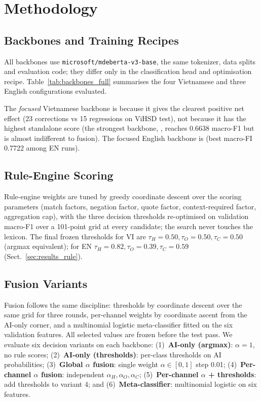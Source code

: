 \section{Methodology}
\label{sec:methodology}

\subsection{Backbones and Training Recipes}
\label{sec:backbones}

All backbones use \texttt{microsoft/mdeberta-v3-base}, the same tokenizer,
data splits and evaluation code; they differ only in the classification head
and optimisation recipe.  Table~\ref{tab:backbones_full} summarises the four
Vietnamese and three English configurations evaluated.



The \emph{focused} Vietnamese backbone is  because
it gives the clearest positive net effect (23 corrections vs 15 regressions on
ViHSD test), not because it has the highest standalone score (the strongest
backbone, , reaches 0.6638 macro-F1 but is
almost indifferent to fusion).  The focused English backbone is
 (best macro-FI 0.7722 among EN runs).

\subsection{Rule-Engine Scoring}
\label{sec:rule_scoring}

Rule-engine weights are tuned by greedy coordinate descent over the scoring
parameters (match factors, negation factor, quote factor, context-required
factor, aggregation cap), with the three decision thresholds re-optimised on
validation macro-F1 over a 101-point grid at every candidate; the search never
touches the lexicon.  The final frozen thresholds for VI are
$\tau_H=0.50, \tau_O=0.50, \tau_C=0.50$ (argmax equivalent); for EN
$\tau_H=0.82, \tau_O=0.39, \tau_C=0.59$ (Sect.~\ref{sec:results_rule}).

\subsection{Fusion Variants}
\label{sec:fusion_variants}

Fusion follows the same discipline: thresholds by coordinate descent over the
same grid for three rounds, per-channel weights by coordinate ascent from the
AI-only corner, and a multinomial logistic meta-classifier fitted on the six
validation features.  All selected values are frozen before the test pass.  We
evaluate six decision variants on each backbone:
(1)~\textbf{AI-only (argmax)}: $\alpha=1$, no rule scores;
(2)~\textbf{AI-only (thresholds)}: per-class thresholds on AI probabilities;
(3)~\textbf{Global $\alpha$ fusion}: single weight $\alpha \in [0,1]$ step 0.01;
(4)~\textbf{Per-channel $\alpha$ fusion}: independent $\alpha_H, \alpha_O, \alpha_C$;
(5)~\textbf{Per-channel $\alpha$ + thresholds}: add thresholds to variant 4; and
(6)~\textbf{Meta-classifier}: multinomial logistic on six features.

